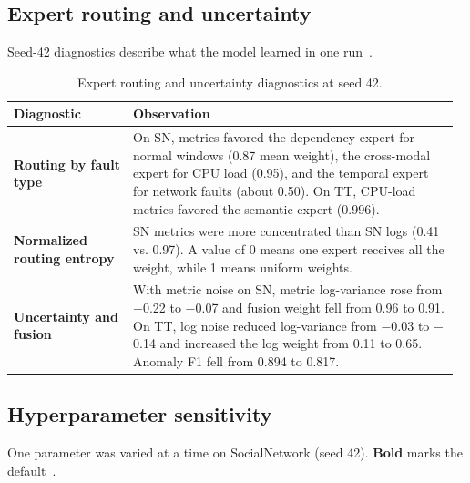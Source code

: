 \documentclass[11pt,a4paper,onecolumn]{IEEEtran}
\begin{document}
\subsection{Expert routing and uncertainty}

Seed-42 diagnostics describe what the model learned in one
run~\cite{implementation-report,experiment-results}.

\begin{table}[H]
\centering
\small
\setlength{\tabcolsep}{4pt}
\renewcommand{\arraystretch}{1.18}
\caption{Expert routing and uncertainty diagnostics at seed 42.}
\begin{tabular}{@{}P{0.26\linewidth}P{0.71\linewidth}@{}}
\toprule
\textbf{Diagnostic} & \textbf{Observation} \\
\midrule
\textbf{Routing by fault type} &
  On SN, metrics favored the dependency expert for normal windows (0.87 mean weight), the cross-modal expert for CPU load (0.95), and the temporal expert for network faults (about 0.50). On TT, CPU-load metrics favored the semantic expert (0.996). \\
\textbf{Normalized routing entropy} &
  SN metrics were more concentrated than SN logs (0.41 vs. 0.97). A value of 0 means one expert receives all the weight, while 1 means uniform weights. \\
\textbf{Uncertainty and fusion} &
  With metric noise on SN, metric log-variance rose from \ensuremath{-}0.22 to \ensuremath{-}0.07 and fusion weight fell from 0.96 to 0.91. On TT, log noise reduced log-variance from \ensuremath{-}0.03 to \ensuremath{-}0.14 and increased the log weight from 0.11 to 0.65. Anomaly F1 fell from 0.894 to 0.817. \\
\bottomrule
\end{tabular}
\end{table}

\subsection{Hyperparameter sensitivity}

One parameter was varied at a time on SocialNetwork (seed 42). \textbf{Bold} marks the
default~\cite{experiment-results}.
\end{document}
